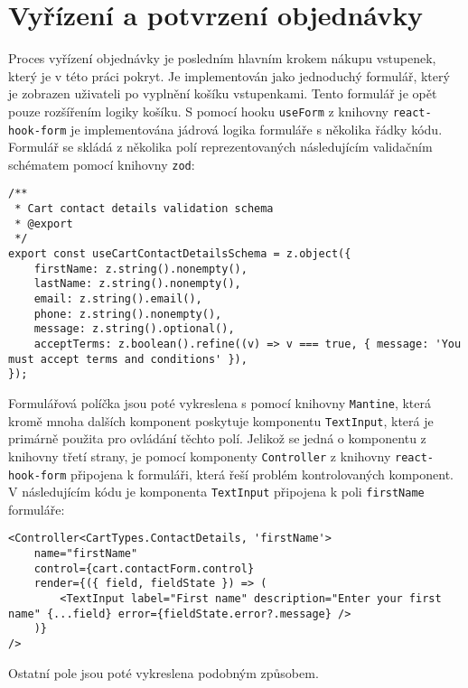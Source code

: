 \section{Vyřízení a potvrzení objednávky}
\label{sec:implementace-checkout}
Proces vyřízení objednávky je posledním hlavním krokem nákupu vstupenek, který je v této práci pokryt.
Je implementován jako jednoduchý formulář, který je zobrazen uživateli po vyplnění košíku vstupenkami.
Tento formulář je opět pouze rozšířením logiky košíku.
S pomocí hooku \texttt{useForm} z knihovny \texttt{react-hook-form} je implementována jádrová logika formuláře s několika řádky kódu.
Formulář se skládá z několika polí reprezentovaných následujícím validačním schématem pomocí knihovny \texttt{zod}:

\begin{verbatim}
/**
 * Cart contact details validation schema
 * @export
 */
export const useCartContactDetailsSchema = z.object({
	firstName: z.string().nonempty(),
	lastName: z.string().nonempty(),
	email: z.string().email(),
	phone: z.string().nonempty(),
	message: z.string().optional(),
	acceptTerms: z.boolean().refine((v) => v === true, { message: 'You must accept terms and conditions' }),
});
\end{verbatim}

Formulářová políčka jsou poté vykreslena s pomocí knihovny \texttt{Mantine}, která kromě mnoha dalších komponent poskytuje komponentu \texttt{TextInput}, která je primárně použita pro ovládání těchto polí.
Jelikož se jedná o komponentu z knihovny třetí strany, je pomocí komponenty \texttt{Controller} z knihovny \texttt{react-hook-form} připojena k formuláři, která řeší problém kontrolovaných komponent.
V následujícím kódu je komponenta \texttt{TextInput} připojena k poli \texttt{firstName} formuláře:

\begin{verbatim}
<Controller<CartTypes.ContactDetails, 'firstName'>
	name="firstName"
	control={cart.contactForm.control}
	render={({ field, fieldState }) => (
		<TextInput label="First name" description="Enter your first name" {...field} error={fieldState.error?.message} />
	)}
/>
\end{verbatim}

Ostatní pole jsou poté vykreslena podobným způsobem.

